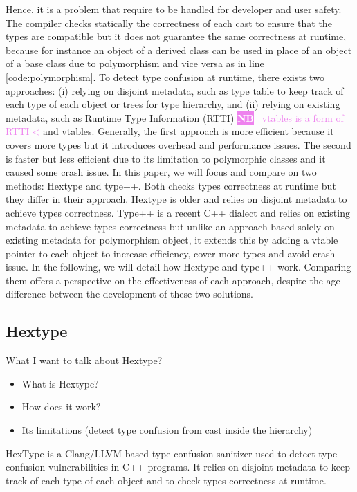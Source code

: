 \documentclass[a4paper,11pt,oneside]{report}
\newcommand{\todobox}[3]{%
       \colorbox{#1}{\textcolor{white}{\sffamily\bfseries\scriptsize #2}}%
       ~\textcolor{#1}{#3} %
       \textcolor{#1}{$\triangleleft$}%
}
\newcommand{\nb}[1]{\todobox{violet}{NB}{#1}}
\begin{document}
Hence, it is a problem that require to be handled for developer and user safety.
The compiler checks statically the correctness of each cast to ensure that the
types are compatible but it does not guarantee the same correctness at runtime, 
because for instance an object of a derived class can be used in place of an
object of a base class due to polymorphism and vice versa as in line
\ref{code:polymorphism}.  To detect type confusion at runtime, there exists two
approaches: (i) relying on disjoint metadata, such as type table to keep track
of each type of each object or trees for type hierarchy, and (ii) relying on
existing metadata, such as Runtime Type Information (RTTI) \nb{vtables is a form of RTTI}and vtables. 
Generally, the first approach is more efficient because it covers more types but
it introduces overhead and performance issues. The second is faster but less
efficient due to its limitation to polymorphic classes and it caused some crash
issue.  In this paper, we will focus and compare on two methods: Hextype and
type++.  Both checks types correctness at runtime but they differ in their
approach. Hextype is older and relies on disjoint metadata to achieve types
correctness.  Type++ is a recent C++ dialect and relies on existing metadata to
achieve types correctness but unlike an approach based solely on existing
metadata for polymorphism object, it extends this by adding a vtable pointer to
each object to increase efficiency, cover more types and avoid crash issue. In
the following, we will detail how Hextype and type++ work.  Comparing them
offers a perspective on the effectiveness of each approach, despite the age
difference between the development of these two solutions.

\subsection{Hextype}
What I want to talk about Hextype?
\begin{itemize}
       \item What is Hextype?
       \item How does it work?
       \item Its limitations (detect type confusion from cast inside the hierarchy)
\end{itemize}

HexType is a Clang/LLVM-based type confusion sanitizer used to detect type
confusion vulnerabilities in C++ programs.  It relies on disjoint metadata to
keep track of each type of each object and to check types correctness at
runtime.
\end{document}
